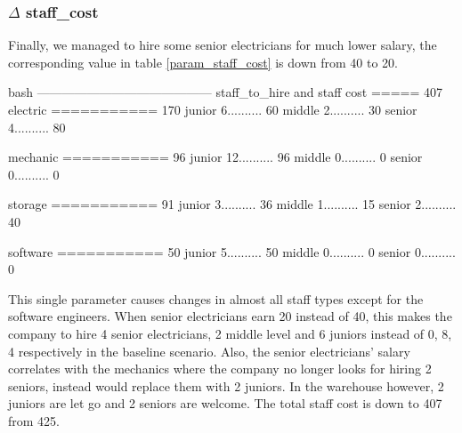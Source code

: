     \subsubsection{$\Delta$ staff\_cost}
    Finally, we managed to hire some senior electricians for much lower salary, the corresponding 
    value in table \ref{param_staff_cost} is down from 40 to 20.
    \bigskip
    \newline
        \vspace{2pt}
        \begin{boxminted}{bash}
            ------------------------------------------
            staff_to_hire and staff cost ===== 407
            electric   =========== 170
            junior     6.......... 60
            middle     2.......... 30
            senior     4.......... 80
            
            mechanic   =========== 96
            junior     12.......... 96
            middle     0.......... 0
            senior     0.......... 0
            
            storage   =========== 91
            junior     3.......... 36
            middle     1.......... 15
            senior     2.......... 40
            
            software   =========== 50
            junior     5.......... 50
            middle     0.......... 0
            senior     0.......... 0                      
        \end{boxminted}
    \newline
    This single parameter causes changes in almost all staff types except for the software engineers.
    When senior electricians earn 20 instead of 40, this makes the company to hire 4 senior 
    electricians, 2 middle level and 6 juniors instead of 0, 8, 4 respectively in the baseline
    scenario. Also, the senior electricians' salary correlates with the mechanics where the company
    no longer looks for hiring 2 seniors, instead would replace them with 2 juniors. In the warehouse
    however, 2 juniors are let go and 2 seniors are welcome. The total staff cost is down to 407 from
    425.